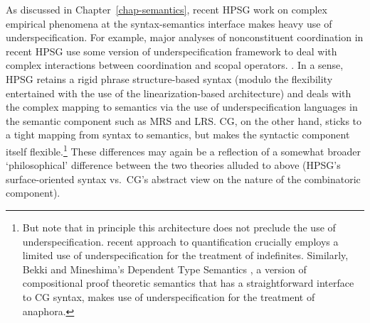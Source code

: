 \documentclass[output=paper]{langsci/langscibook}
\begin{document}



As discussed in Chapter~\ref{chap-semantics}, recent HPSG work on complex empirical
phenomena at the syntax-semantics interface makes heavy use of
underspecification. For example, major
analyses of nonconstituent coordination in recent HPSG use some
version of underspecification framework to deal with complex
interactions between coordination and scopal operators.
\citep{BS2004a,Yatabe2001a,parkea18gapping}. In a sense, HPSG retains a
rigid phrase structure-based syntax (modulo the flexibility
entertained with the use of the linearization-based architecture) and
deals with the complex mapping to semantics 
via the use of underspecification languages in the semantic
component such as MRS and LRS.
CG, on the other hand, sticks to a tight mapping from syntax to
semantics, but makes the syntactic component itself
flexible.\footnote{But note that in principle this architecture does
not preclude the use of underspecification.  recent
approach to quantification crucially employs a limited use of
underspecification for the treatment of indefinites. Similarly, Bekki
and Mineshima's Dependent Type Semantics \citep{bekki14,bekkimineshima17},
a version of compositional
proof theoretic semantics that has a straightforward interface to CG
syntax, makes use of underspecification for the treatment of
anaphora.} These differences may again be a reflection of a
somewhat broader `philosophical' difference between the two theories
alluded to above (HPSG's surface-oriented syntax vs.\  CG's abstract view
on the nature of the combinatoric component).
\end{document}
